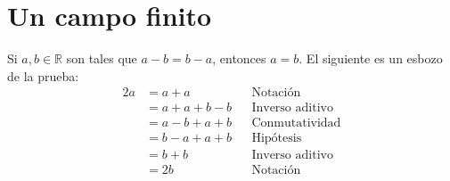 \documentclass[11pt]{article}
\newcommand{\R}{\mathbb{R}}
\begin{document}
\section*{Un campo finito}

Si $a,b\in \R$ son tales que $a-b=b-a$, entonces $a=b$. El siguiente es un esbozo de la prueba:
\begin{align*}
 2a %
 &= a + a && \text{Notación}\\
 &= a+a+b-b && \text{Inverso aditivo}\\
 &= a-b+a+b && \text{Conmutatividad}\\
 &= b-a +a +b && \text{Hipótesis}\\
 &= b+b && \text{Inverso aditivo}\\
 &= 2b && \text{Notación}
\end{align*}
\end{document}
